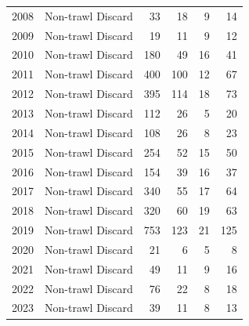 \documentclass[
  english,
]{article}
\begin{document}
\begin{longtable}{rlrrrr}
2008 & Non-trawl Discard & 33 & 18 & 9 & 14 \\ 
2009 & Non-trawl Discard & 19 & 11 & 9 & 12 \\ 
2010 & Non-trawl Discard & 180 & 49 & 16 & 41 \\ 
2011 & Non-trawl Discard & 400 & 100 & 12 & 67 \\ 
2012 & Non-trawl Discard & 395 & 114 & 18 & 73 \\ 
2013 & Non-trawl Discard & 112 & 26 & 5 & 20 \\ 
2014 & Non-trawl Discard & 108 & 26 & 8 & 23 \\ 
2015 & Non-trawl Discard & 254 & 52 & 15 & 50 \\ 
2016 & Non-trawl Discard & 154 & 39 & 16 & 37 \\ 
2017 & Non-trawl Discard & 340 & 55 & 17 & 64 \\ 
2018 & Non-trawl Discard & 320 & 60 & 19 & 63 \\ 
2019 & Non-trawl Discard & 753 & 123 & 21 & 125 \\ 
2020 & Non-trawl Discard & 21 & 6 & 5 & 8 \\ 
2021 & Non-trawl Discard & 49 & 11 & 9 & 16 \\ 
2022 & Non-trawl Discard & 76 & 22 & 8 & 18 \\ 
2023 & Non-trawl Discard & 39 & 11 & 8 & 13 \\ 
\bottomrule

\end{longtable}

\endgroup

\newpage{}

\begingroup
\fontsize{9.0pt}{11.0pt}\selectfont
\end{document}
